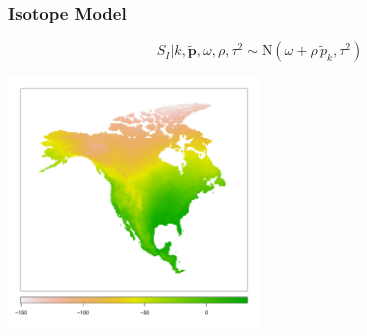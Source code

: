 \documentclass[t]{beamer}\usepackage[]{graphicx}\usepackage[]{color}
\begin{document}

\begin{frame}
\frametitle{Isotope Model}

\[ S_I | k,\bm{\tilde p}, \omega, \rho, \tau^2 \sim \text{N}(\omega+\rho \, \tilde{p}_k, \tau^2) \]
 
\vfill

\begin{center}
\includegraphics[width=0.5\textwidth]{figs/isoscape.pdf}
\end{center}

\vfill

\end{frame}

\end{document}
